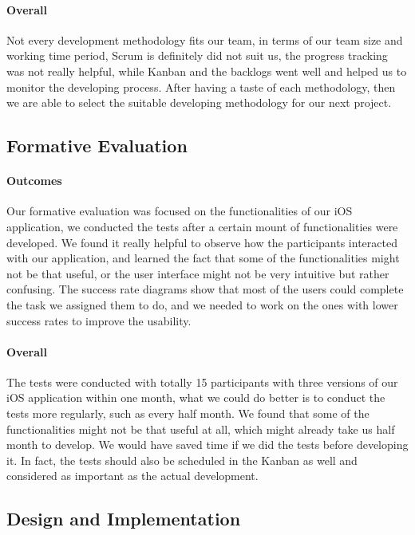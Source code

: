 \documentclass[12pt,a4paper]{article}
\begin{document}
        \paragraph{Overall} Not every development methodology fits our team, in terms of our team size and working time period, Scrum is definitely did not suit us, the progress tracking was not really helpful, while Kanban and the backlogs went well and helped us to monitor the developing process. After having a taste of each methodology, then we are able to select the suitable developing methodology for our next project.

      \subsection{Formative Evaluation}
        \paragraph{Outcomes} Our formative evaluation was focused on the functionalities of our iOS application, we conducted the tests after a certain mount of functionalities were developed. We found it really helpful to observe how the participants interacted with our application, and learned the fact that some of the functionalities might not be that useful, or the user interface might not be very intuitive but rather confusing. The success rate diagrams show that most of the users could complete the task we assigned them to do, and we needed to work on the ones with lower success rates to improve the usability. 

        \paragraph{Overall} The tests were conducted with totally 15 participants with three versions of our iOS application within one month, what we could do better is to conduct the tests more regularly, such as every half month. We found that some of the functionalities might not be that useful at all, which might already take us half month to develop. We would have saved time if we did the tests before developing it. In fact, the tests should also be scheduled in the Kanban as well and considered as important as the actual development.

      \subsection{Design and Implementation}
\end{document}
